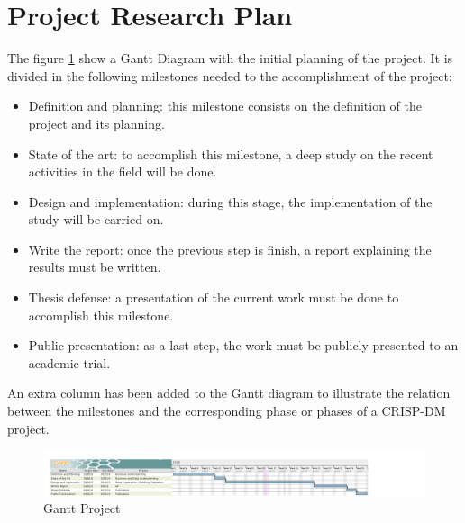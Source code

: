 \section{Project Research Plan}

The figure \ref{fig:gantt} show a Gantt Diagram with the initial planning of the project.
It is divided in the following milestones needed to the accomplishment of the project:

\begin{itemize}
    \item Definition and planning: this milestone consists on the definition of the project and its planning.
    \item State of the art: to accomplish this milestone, a deep study on the recent activities in the field will be done.
    \item Design and implementation: during this stage, the implementation of the study will be carried on.
    \item Write the report: once the previous step is finish, a report explaining the results must be written.
    \item Thesis defense: a presentation of the current work must be done to accomplish this milestone.
    \item Public presentation: as a last step, the work must be publicly presented to an academic trial.
\end{itemize}

An extra column has been added to the Gantt diagram to illustrate the relation between the milestones and the corresponding phase or phases of a CRISP-DM project.

\begin{figure}[h]
    \centering
    \includegraphics[angle=90, width=\textwidth,height=\textheight,keepaspectratio]{../figs/TFM_plan_2.png}
    \caption{Gantt Project}
    \label{fig:gantt}
\end{figure}